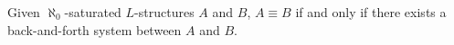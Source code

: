 Given $\aleph_0$-saturated $L$-structures $A$ and $B$, $A \equiv B$ if and only if there exists a back-and-forth system between $A$ and $B$.
